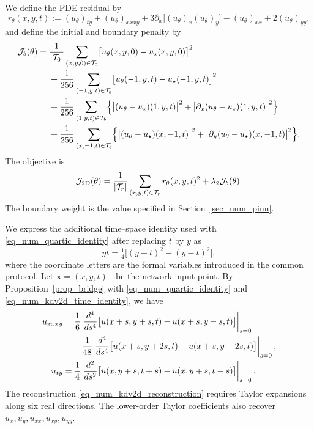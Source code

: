 \documentclass[final,oneeqnum]{siamltex}
\newcommand{\bx}{\bm{x}}
\begin{document}
We define the PDE residual by
\begin{equation*}
    r_\theta(x, y, t) := (u_\theta)_{ty} + (u_\theta)_{xxxy} + 3 \partial_x \bigl[(u_\theta)_x (u_\theta)_y\bigr] - (u_\theta)_{xx} + 2 (u_\theta)_{yy},
\end{equation*}
and define the initial and boundary penalty by
\begin{align*}
    \mathcal J_b(\theta) = {} & \frac{1}{|\mathcal T_0|} \sum_{(x, y, 0) \in \mathcal T_0} \bigl[u_\theta(x, y, 0) - u_\star(x, y, 0)\bigr]^2                                                          \\
                              & + \frac{1}{256} \sum_{(-1, y, t) \in \mathcal T_b} \bigl[u_\theta(-1, y, t) - u_\star(-1, y, t)\bigr]^2                                                                 \\
                              & + \frac{1}{256} \sum_{(1, y, t) \in \mathcal T_b} \Bigl\{\bigl|(u_\theta - u_\star)(1, y, t)\bigr|^2 + \bigl|\partial_x (u_\theta - u_\star)(1, y, t)\bigr|^2\Bigr\}     \\
                              & + \frac{1}{256} \sum_{(x, -1, t) \in \mathcal T_b} \Bigl\{\bigl|(u_\theta - u_\star)(x, -1, t)\bigr|^2 + \bigl|\partial_y (u_\theta - u_\star)(x, -1, t)\bigr|^2\Bigr\}.
\end{align*}
The objective is
\begin{equation}\label{eq_num_kdv2d_loss}
    \mathcal J_{\rm 2D}(\theta) = \frac{1}{|\mathcal T_r|} \sum_{(x, y, t) \in \mathcal T_r} r_\theta(x, y, t)^2 + \lambda_2 \mathcal J_b(\theta).
\end{equation}
The boundary weight is the value specified in Section~\ref{sec_num_pinn}.

We express the additional time--space identity used with \eqref{eq_num_quartic_identity} after replacing $t$ by $y$ as
\begin{equation}\label{eq_num_kdv2d_time_identity}
    y t = \tfrac{1}{4} \bigl[(y + t)^2 - (y - t)^2\bigr],
\end{equation}
where the coordinate letters are the formal variables introduced in the common protocol.
Let $\bx = (x, y, t)^\top$ be the network input point.
By Proposition~\ref{prop_bridge} with \eqref{eq_num_quartic_identity} and \eqref{eq_num_kdv2d_time_identity}, we have
\begin{align}
    u_{xxxy} & = \frac{1}{6} \left.\frac{d^4}{d s^4} \bigl[u(x + s, y + s, t) - u(x + s, y - s, t)\bigr]\right|_{s = 0} \notag                                         \\
             & \quad - \frac{1}{48} \left.\frac{d^4}{d s^4} \bigl[u(x + s, y + 2 s, t) - u(x + s, y - 2 s, t)\bigr]\right|_{s = 0}, \label{eq_num_kdv2d_reconstruction} \\
    u_{ty}   & = \frac{1}{4} \left.\frac{d^2}{d s^2} \bigl[u(x, y + s, t + s) - u(x, y + s, t - s)\bigr]\right|_{s = 0}. \notag
\end{align}
The reconstruction \eqref{eq_num_kdv2d_reconstruction} requires Taylor expansions along six real directions.
The lower-order Taylor coefficients also recover $u_x, u_y, u_{xx}, u_{xy}, u_{yy}$.
\end{document}
